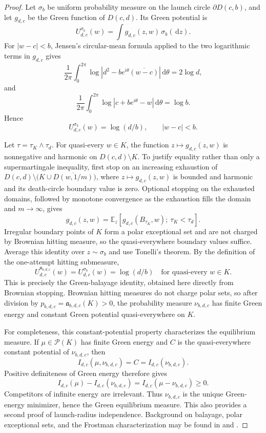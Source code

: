 \documentclass[11pt]{article}
\theoremstyle{mainthm}
\theoremstyle{definition}
\theoremstyle{remark}
\newcommand{\E}{\mathbb E}
\newcommand{\dd}{\,\mathrm d}
\begin{document}
\begin{proof}
Let $\sigma_b$ be uniform probability measure on the launch circle $\partial D(c,b)$, and let $g_{d,c}$ be the Green function of $D(c,d)$. Its Green potential is
\[
  U_{d,c}^{\sigma_b}(w)
  =\int g_{d,c}(z,w)\,\sigma_b(\dd z).
\]
For $|w-c|<b$, Jensen's circular-mean formula applied to the two logarithmic terms in $g_{d,c}$ gives
\[
  \frac1{2\pi}\int_0^{2\pi}
  \log\left|d^2-be^{i\theta}\overline{(w-c)}\right|\dd\theta
  =2\log d,
\]
and
\[
  \frac1{2\pi}\int_0^{2\pi}
  \log|c+be^{i\theta}-w|\dd\theta
  =\log b.
\]
Hence
\begin{equation}
  U_{d,c}^{\sigma_b}(w)=\log(d/b),
  \qquad |w-c|<b.
  \label{eq:launch-potential-constant}
\end{equation}

Let $\tau=\tau_K\wedge\tau_d$. For quasi-every $w\in K$, the function $z\mapsto g_{d,c}(z,w)$ is nonnegative and harmonic on $D(c,d)\setminus K$. To justify equality rather than only a supermartingale inequality, first stop on an increasing exhaustion of $D(c,d)\setminus\bigl(K\cup\overline{D(w,1/m)}\bigr)$, where $z\mapsto g_{d,c}(z,w)$ is bounded and harmonic and its death-circle boundary value is zero. Optional stopping on the exhausted domains, followed by monotone convergence as the exhaustion fills the domain and $m\to\infty$, gives
\[
  g_{d,c}(z,w)
  =\E_z\!\left[g_{d,c}(B_{\tau_K},w);\ \tau_K<\tau_d\right].
\]
Irregular boundary points of $K$ form a polar exceptional set and are not charged by Brownian hitting measure, so the quasi-everywhere boundary values suffice.
Average this identity over $z\sim\sigma_b$ and use Tonelli's theorem. By the definition of the one-attempt hitting submeasure,
\begin{equation}
  U_{d,c}^{\mathfrak a_{b,d,c}}(w)
  =U_{d,c}^{\sigma_b}(w)
  =\log(d/b)
  \quad\text{for quasi-every }w\in K.
  \label{eq:balayage-potential}
\end{equation}
This is precisely the Green-balayage identity, obtained here directly from Brownian stopping. Brownian hitting measures do not charge polar sets, so after division by
$p_{b,d,c}=\mathfrak a_{b,d,c}(K)>0$, the probability measure
$\nu_{b,d,c}$ has finite Green energy and constant Green potential quasi-everywhere on $K$.

For completeness, this constant-potential property characterizes the equilibrium measure. If $\mu\in\mathcal P(K)$ has finite Green energy and $C$ is the quasi-everywhere constant potential of $\nu_{b,d,c}$, then
\[
  I_{d,c}(\mu,\nu_{b,d,c})=C=I_{d,c}(\nu_{b,d,c}).
\]
Positive definiteness of Green energy therefore gives
\[
  I_{d,c}(\mu)-I_{d,c}(\nu_{b,d,c})
  =I_{d,c}(\mu-\nu_{b,d,c})\ge0.
\]
Competitors of infinite energy are irrelevant. Thus $\nu_{b,d,c}$ is the unique Green-energy minimizer, hence the Green equilibrium measure. This also provides a second proof of launch-radius independence. Background on balayage, polar exceptional sets, and the Frostman characterization may be found in \cite[Chs.~4--5]{Ransford1995} and \cite[Part~I]{SaffTotik1997}.
\end{proof}
\end{document}
